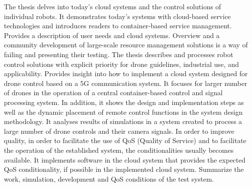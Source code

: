 The thesis delves into today’s cloud systems and the control solutions of individual robots.
It demonstrates today’s systems with cloud-based service technologies and introduces readers to container-based service management. Provides a description of user needs and cloud systems. Overview and a community development of large-scale resource management solutions is a way of failing and presenting their testing. The thesis describes and processes robot control solutions with explicit priority for drone guidelines, industrial use, and applicability. Provides insight into how to implement a cloud system designed for drone control based on a 5G communication system. It focuses for larger number of drones in the operation of a central container-based control and signal processing system. In addition, it shows the design and implementation steps as well as the dynamic placement of remote control functions in the system design methodology. It analyses results of simulations in a system created to process a large number of drone controls and their camera signals. In order to improve quality, in order to facilitate the use of QoS (Quality of Service) and to facilitate the operation of the established system, the conditionalities usually becomes available. It implements software in the cloud system that provides the expected QoS conditionality, if possible in the implemented cloud system. Summarize the work, simulation, development and QoS conditions of the test system.

\vfill
\selectthesislanguage

\setcounter{romanPage}{\value{page}}
